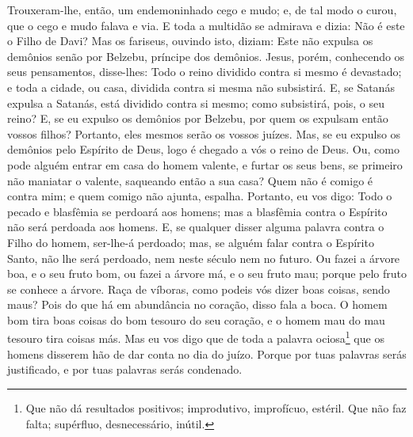 Trouxeram-lhe, então, um endemoninhado cego e mudo; e, de tal
modo o curou, que o cego e mudo falava e via. E toda a
multidão se admirava e dizia: Não é este o Filho de Davi? Mas
os fariseus, ouvindo isto, diziam: Este não expulsa os demônios
senão por Belzebu, príncipe dos demônios. Jesus, porém,
conhecendo os seus pensamentos, disse-lhes: Todo o reino dividido
contra si mesmo é devastado; e toda a cidade, ou casa, dividida
contra si mesma não subsistirá. E, se Satanás expulsa a
Satanás, está dividido contra si mesmo; como subsistirá, pois, o seu
reino? E, se eu expulso os demônios por Belzebu, por quem os
expulsam então vossos filhos? Portanto, eles mesmos serão os vossos
juízes. Mas, se eu expulso os demônios pelo Espírito de Deus,
logo é chegado a vós o reino de Deus. Ou, como pode alguém
entrar em casa do homem valente, e furtar os seus bens, se primeiro
não maniatar o valente, saqueando então a sua casa? Quem não
é comigo é contra mim; e quem comigo não ajunta, espalha.
Portanto, eu vos digo: Todo o pecado e blasfêmia se perdoará
aos homens; mas a blasfêmia contra o Espírito não será perdoada aos
homens. E, se qualquer disser alguma palavra contra o Filho
do homem, ser-lhe-á perdoado; mas, se alguém falar contra o Espírito
Santo, não lhe será perdoado, nem neste século nem no futuro.
Ou fazei a árvore boa, e o seu fruto bom, ou fazei a árvore
má, e o seu fruto mau; porque pelo fruto se conhece a árvore.
Raça de víboras, como podeis vós dizer boas coisas, sendo
maus? Pois do que há em abundância no coração, disso fala a boca.
O homem bom tira boas coisas do bom tesouro do seu coração, e
o homem mau do mau tesouro tira coisas más. Mas eu vos digo
que de toda a palavra ociosa\footnote{Que não dá resultados
positivos; improdutivo, improfícuo, estéril. Que não faz falta;
supérfluo, desnecessário, inútil.} que os homens disserem hão de dar
conta no dia do juízo. Porque por tuas palavras serás
justificado, e por tuas palavras serás condenado.

